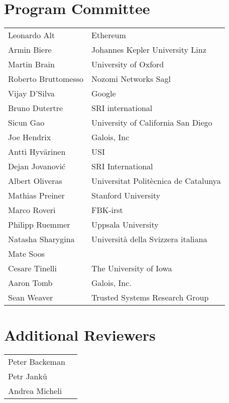 \documentclass{easychair}
\begin{document}
\section*{Program Committee}
\noindent
\begin{longtable}{p{}p{}}
Leonardo Alt & Ethereum\\
Armin Biere & Johannes Kepler University Linz\\
Martin Brain & University of Oxford\\
Roberto Bruttomesso & Nozomi Networks Sagl\\
Vijay D'Silva & Google\\
Bruno Dutertre & SRI international\\
Sicun Gao & University of California San Diego\\
Joe Hendrix & Galois, Inc\\
Antti Hyv\"arinen & USI\\
Dejan Jovanovi\'c & SRI International\\
Albert Oliveras & Universitat Polit\`ecnica de Catalunya\\
Mathias Preiner & Stanford University\\
Marco Roveri & FBK-irst\\
Philipp Ruemmer & Uppsala University\\
Natasha Sharygina & Universit\`a della Svizzera italiana\\
Mate Soos &\\
Cesare Tinelli & The University of Iowa\\
Aaron Tomb & Galois, Inc.\\
Sean Weaver & Trusted Systems Research Group\\
\end{longtable}

\section*{Additional Reviewers}
\begin{longtable}{p{}p{}}
Peter Backeman &\\
Petr Jank\r{u} &\\
Andrea Micheli &\\
\end{longtable}
\end{document}
